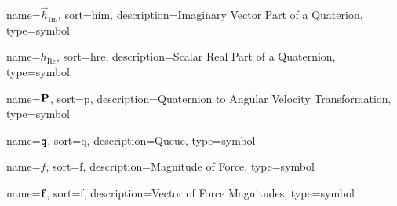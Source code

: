 	{%
		name=\ensuremath{\vec{h}_{\mathrm{Im}}}, %
		sort=him,
		description=Imaginary Vector Part of a Quaterion,
		type=symbol
	}
	\newcommand{\quaternionimg}{\gls{sym:quaternionimg}}

	{%
		name=\ensuremath{h_{\mathrm{Re}}}, %
		sort=hre,
		description=Scalar Real Part of a Quaternion,
		type=symbol
	}
	\newcommand{\quaternionre}{\gls{sym:quaternionre}}

	{%
		name=\ensuremath{\mat{P}}, %
		sort=p,
		description=Quaternion to Angular Velocity Transformation,
		type=symbol
	}
	\newcommand{\quaternionToAvelTrans}{\gls{sym:quaternionToAvelTrans}}

	{%
		name=\ensuremath{\code{q}},
		sort=q,
		description=Queue,
		type=symbol
	}
	\newcommand{\queue}{\gls{sym:queue}}

	{%
		name=\ensuremath{f},
		sort=f,
		description=Magnitude of Force,
		type=symbol
	}
	\newcommand{\forcemag}{\gls{sym:forcemag}}

	{%
		name=\ensuremath{\mat{f}},
		sort=f,
		description=Vector of Force Magnitudes,
		type=symbol
	}
	\newcommand{\forcemagvec}{\gls{sym:forcemagvec}}

